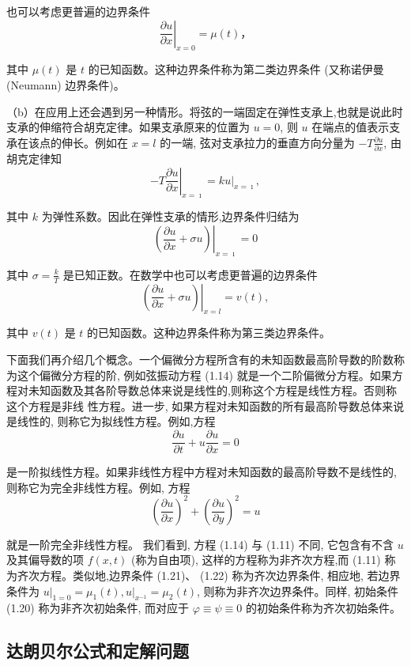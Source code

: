 也可以考虑更普遍的边界条件
$$
\left.\frac{\partial u}{\partial x}\right|_{x=0}=\mu(t) ，
$$

其中 $\mu(t)$ 是 $t$ 的已知函数。这种边界条件称为第二类边界条件 (又称诺伊曼 (Neumann) 边界条件)。

（b）在应用上还会遇到另一种情形。将弦的一端固定在弹性支承上,也就是说此时支承的伸缩符合胡克定律。如果支承原来的位置为 $u=0$, 则 $u$ 在端点的值表示支承在该点的伸长。例如在 $x=l$ 的一端, 弦对支承拉力的垂直方向分量为 $-T \frac{\partial u}{\partial x}$, 由胡克定律知
$$
-\left.T \frac{\partial u}{\partial x}\right|_{x=\imath}=\left.k u\right|_{x=\imath},
$$

其中 $k$ 为弹性系数。因此在弹性支承的情形,边界条件归结为
$$
\left.\left(\frac{\partial u}{\partial x}+\sigma u\right)\right|_{x=\imath}=0
$$

其中 $\sigma=\frac{k}{T}$ 是已知正数。在数学中也可以考虑更普遍的边界条件
$$
\left.\left(\frac{\partial u}{\partial x}+\sigma u\right)\right|_{x=l}=v(t),
$$

其中 $v(t)$ 是 $t$ 的已知函数。这种边界条件称为第三类边界条件。

下面我们再介绍几个概念。一个偏微分方程所含有的未知函数最高阶导数的阶数称为这个偏微分方程的阶, 例如弦振动方程 (1.14) 就是一个二阶偏微分方程。如果方程对未知函数及其各阶导数总体来说是线性的,则称这个方程是线性方程。否则称这个方程是非线
性方程。进一步, 如果方程对未知函数的所有最高阶导数总体来说是线性的, 则称它为拟线性方程。例如,方程
$$
\frac{\partial u}{\partial t}+u \frac{\partial u}{\partial x}=0
$$

是一阶拟线性方程。如果非线性方程中方程对未知函数的最高阶导数不是线性的, 则称它为完全非线性方程。例如, 方程
$$
\left(\frac{\partial u}{\partial x}\right)^2+\left(\frac{\partial u}{\partial y}\right)^2=u
$$

就是一阶完全非线性方程。
我们看到, 方程 (1.14) 与 (1.11) 不同, 它包含有不含 $u$ 及其偏导数的项 $f(x, t)$ (称为自由项), 这样的方程称为非齐次方程,而 (1.11) 称为齐次方程。类似地,边界条件 (1.21)、 (1.22) 称为齐次边界条件,
相应地, 若边界条件为 $\left.u\right|_{1=0}=\mu_1(t),\left.u\right|_{x^{-1}}=\mu_2(t)$, 则称为非齐次边界条件。同样, 初始条件 (1.20) 称为非齐次初始条件, 而对应于 $\varphi \equiv \psi \equiv 0$ 的初始条件称为齐次初始条件。
\subsection{达朗贝尔公式和定解问题}
